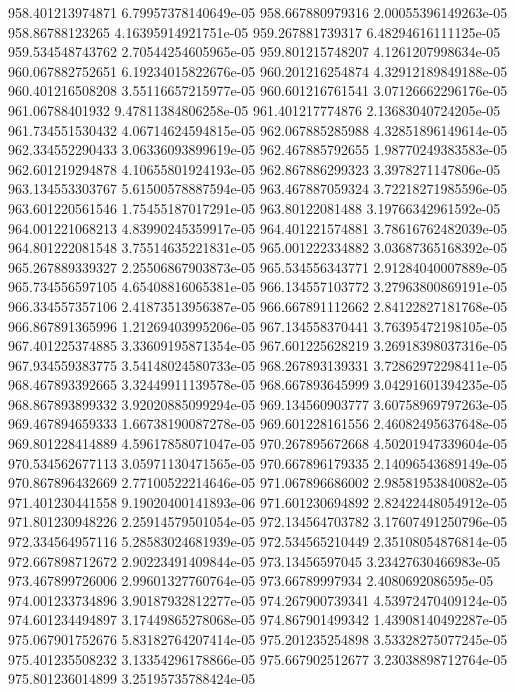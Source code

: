 {958.401213974871 6.79957378140649e-05
958.667880979316 2.00055396149263e-05
958.86788123265 4.16395914921751e-05
959.267881739317 6.48294616111125e-05
959.534548743762 2.70544254605965e-05
959.801215748207 4.1261207998634e-05
960.067882752651 6.19234015822676e-05
960.201216254874 4.32912189849188e-05
960.401216508208 3.55116657215977e-05
960.601216761541 3.07126662296176e-05
961.06788401932 9.47811384806258e-05
961.401217774876 2.13683040724205e-05
961.734551530432 4.06714624594815e-05
962.067885285988 4.32851896149614e-05
962.334552290433 3.06336093899619e-05
962.467885792655 1.98770249383583e-05
962.601219294878 4.10655801924193e-05
962.867886299323 3.3978271147806e-05
963.134553303767 5.61500578887594e-05
963.467887059324 3.72218271985596e-05
963.601220561546 1.75455187017291e-05
963.80122081488 3.19766342961592e-05
964.001221068213 4.83990245359917e-05
964.401221574881 3.78616762482039e-05
964.801222081548 3.75514635221831e-05
965.001222334882 3.03687365168392e-05
965.267889339327 2.25506867903873e-05
965.534556343771 2.91284040007889e-05
965.734556597105 4.65408816065381e-05
966.134557103772 3.27963800869191e-05
966.334557357106 2.41873513956387e-05
966.667891112662 2.84122827181768e-05
966.867891365996 1.21269403995206e-05
967.134558370441 3.76395472198105e-05
967.401225374885 3.33609195871354e-05
967.601225628219 3.26918398037316e-05
967.934559383775 3.54148024580733e-05
968.267893139331 3.72862972298411e-05
968.467893392665 3.32449911139578e-05
968.667893645999 3.04291601394235e-05
968.867893899332 3.92020885099294e-05
969.134560903777 3.60758969797263e-05
969.467894659333 1.66738190087278e-05
969.601228161556 2.46082495637648e-05
969.801228414889 4.59617858071047e-05
970.267895672668 4.50201947339604e-05
970.534562677113 3.05971130471565e-05
970.667896179335 2.14096543689149e-05
970.867896432669 2.77100522214646e-05
971.067896686002 2.98581953840082e-05
971.401230441558 9.19020400141893e-06
971.601230694892 2.82422448054912e-05
971.801230948226 2.25914579501054e-05
972.134564703782 3.17607491250796e-05
972.334564957116 5.28583024681939e-05
972.534565210449 2.35108054876814e-05
972.667898712672 2.90223491409844e-05
973.13456597045 3.23427630466983e-05
973.467899726006 2.99601327760764e-05
973.66789997934 2.4080692086595e-05
974.001233734896 3.90187932812277e-05
974.267900739341 4.53972470409124e-05
974.601234494897 3.17449865278068e-05
974.867901499342 1.43908140492287e-05
975.067901752676 5.83182764207414e-05
975.201235254898 3.53328275077245e-05
975.401235508232 3.13354296178866e-05
975.667902512677 3.23038898712764e-05
975.801236014899 3.25195735788424e-05
}
